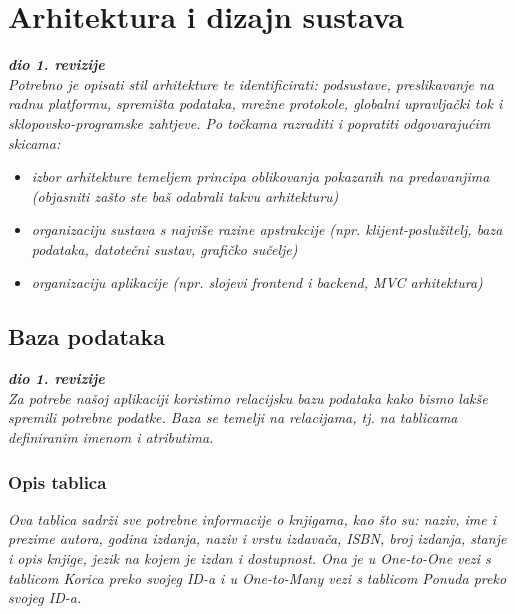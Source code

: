 \chapter{Arhitektura i dizajn sustava}
		
		\textbf{\textit{dio 1. revizije}}\\

		\textit{ Potrebno je opisati stil arhitekture te identificirati: podsustave, preslikavanje na radnu platformu, spremišta podataka, mrežne protokole, globalni upravljački tok i sklopovsko-programske zahtjeve. Po točkama razraditi i popratiti odgovarajućim skicama:}
	\begin{itemize}
		\item 	\textit{izbor arhitekture temeljem principa oblikovanja pokazanih na predavanjima (objasniti zašto ste baš odabrali takvu arhitekturu)}
		\item 	\textit{organizaciju sustava s najviše razine apstrakcije (npr. klijent-poslužitelj, baza podataka, datotečni sustav, grafičko sučelje)}
		\item 	\textit{organizaciju aplikacije (npr. slojevi frontend i backend, MVC arhitektura) }		
	\end{itemize}

	
		

		

				
		\section{Baza podataka}
			
			\textbf{\textit{dio 1. revizije}}\\
			
		\textit{Za potrebe našoj aplikaciji koristimo relacijsku bazu podataka kako bismo lakše spremili potrebne podatke. Baza se temelji na relacijama, tj. na tablicama definiranim imenom i atributima.}
		
			\subsection{Opis tablica}
			

				\textit{Ova tablica sadrži sve potrebne informacije o knjigama, kao što su:
					 naziv, ime i prezime autora, godina izdanja, naziv i vrstu izdavača, ISBN, broj
					  izdanja, stanje i opis knjige, jezik na kojem je izdan i dostupnost. Ona je u
					   One-to-One vezi s tablicom Korica preko svojeg ID-a i u One-to-Many vezi s tablicom Ponuda preko svojeg ID-a.}
				
